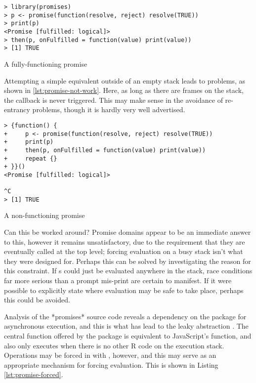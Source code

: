 \begin{listing}
\begin{verbatim}
> library(promises)
> p <- promise(function(resolve, reject) resolve(TRUE))
> print(p)
<Promise [fulfilled: logical]>
> then(p, onFulfilled = function(value) print(value))
> [1] TRUE
\end{verbatim}
\caption{A fully-functioning promise}
\label{lst:promise-work}
\end{listing}

Attempting a simple equivalent outside of an empty stack leads to problems, as shown in \ref{lst:promise-not-work}.
Here, as long as there are frames on the stack, the  callback is never triggered.
This may make sense in the avoidance of re-entrancy problems, though it is hardly very well advertised.

\begin{listing}
\begin{verbatim}
> {function() {
+     p <- promise(function(resolve, reject) resolve(TRUE))
+     print(p)
+     then(p, onFulfilled = function(value) print(value))
+     repeat {}
+ }}()
<Promise [fulfilled: logical]>

^C
> [1] TRUE
\end{verbatim}
\caption{A non-functioning promise}
\label{lst:promise-not-work}
\end{listing}

Can this be worked around?
Promise domains appear to be an immediate answer to this, however it remains unsatisfactory, due to the requirement that they are eventually called at the top level; forcing evaluation on a busy stack isn't what they were designed for.
Perhaps this can be solved by investigating the reason for this constraint.
If s could just be evaluated anywhere in the stack, race conditions far more serious than a prompt mis-print are certain to manifest.
If it were possible to explicitly state where evaluation may be safe to take place, perhaps this could be avoided.

Analysis of the *promises* source code reveals a dependency on the  package for asynchronous execution, and this is what has lead to the leaky abstraction \cite{chang2021later}.
The central  function offered by the package is equivalent to JavaScript's  function, and also only executes when there is no other R code on the execution stack.
Operations may be forced in  with , however, and this may serve as an appropriate mechanism for forcing evaluation.
This is shown in Listing \ref{lst:promise-forced}.

